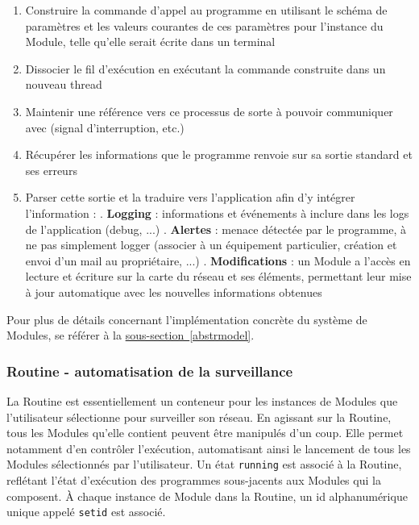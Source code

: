\documentclass[]{article}
\newcommand{\wordlink}[2]{\hyperref[#1]{#2~\ref{#1}}}
\begin{document}
\begin{enumerate}
\item Construire la commande d'appel au programme en utilisant le schéma de paramètres et les valeurs courantes de ces paramètres pour l'instance du Module, telle qu'elle serait écrite dans un terminal
\item Dissocier le fil d'exécution en exécutant la commande construite dans un nouveau thread
\item Maintenir une référence vers ce processus de sorte à pouvoir communiquer avec (signal d'interruption, etc.)
\item Récupérer les informations que le programme renvoie sur sa sortie standard et ses erreurs
\item Parser cette sortie et la traduire vers l'application afin d'y intégrer l'information :
. \textbf{Logging} : informations et événements à inclure dans les logs de l'application (debug, ...)
. \textbf{Alertes} : menace détectée par le programme, à ne pas simplement logger (associer à un équipement particulier, création et envoi d'un mail au propriétaire, ...)
. \textbf{Modifications} : un Module a l'accès en lecture et écriture sur la carte du réseau et ses éléments, permettant leur mise à jour automatique avec les nouvelles informations obtenues
\end{enumerate}

\vspace{0.4cm}

Pour plus de détails concernant l'implémentation concrète du système de Modules, se référer à la \wordlink{abstrmodel}{sous-section}.

\subsubsection{Routine - automatisation de la surveillance}

\par La Routine est essentiellement un conteneur pour les instances de Modules que l'utilisateur sélectionne pour surveiller son réseau. En agissant sur la Routine, tous les Modules qu'elle contient peuvent être manipulés d'un coup. Elle permet notamment d'en contrôler l'exécution, automatisant ainsi le lancement de tous les Modules sélectionnés par l'utilisateur. Un état \texttt{running} est associé à la Routine, reflétant l'état d'exécution des programmes sous-jacents aux Modules qui la composent. À chaque instance de Module dans la Routine, un id alphanumérique unique appelé \texttt{setid} est associé.\\
\end{document}
